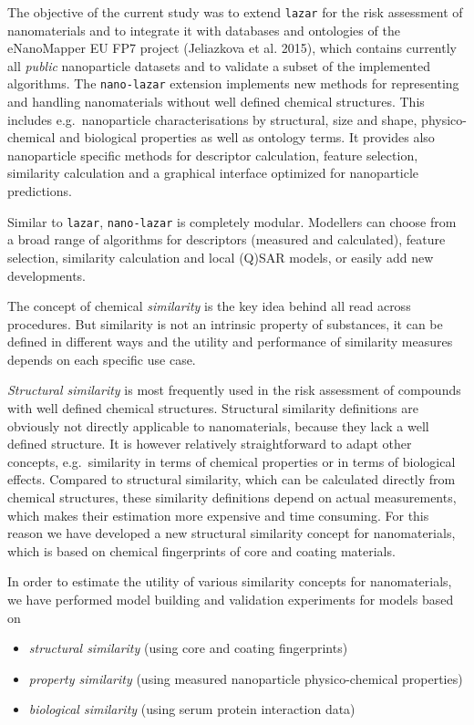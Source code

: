 \documentclass[utf8]{frontiersHLTH} %
\providecommand{\tightlist}{%
  \setlength{\itemsep}{0pt}\setlength{\parskip}{0pt}}
\begin{document}
The objective of the current study was to extend \texttt{lazar} for the
risk assessment of nanomaterials and to integrate it with databases and
ontologies of the eNanoMapper EU FP7 project (Jeliazkova et al. 2015),
which contains currently all \emph{public} nanoparticle datasets and to
validate a subset of the implemented algorithms. The \texttt{nano-lazar}
extension implements new methods for representing and handling
nanomaterials without well defined chemical structures. This includes
e.g.~nanoparticle characterisations by structural, size and shape,
physico-chemical and biological properties as well as ontology terms. It
provides also nanoparticle specific methods for descriptor calculation,
feature selection, similarity calculation and a graphical interface
optimized for nanoparticle predictions.

Similar to \texttt{lazar}, \texttt{nano-lazar} is completely modular.
Modellers can choose from a broad range of algorithms for descriptors
(measured and calculated), feature selection, similarity calculation and
local (Q)SAR models, or easily add new developments.

The concept of chemical \emph{similarity} is the key idea behind all
read across procedures. But similarity is not an intrinsic property of
substances, it can be defined in different ways and the utility and
performance of similarity measures depends on each specific use case.

\emph{Structural similarity} is most frequently used in the risk
assessment of compounds with well defined chemical structures.
Structural similarity definitions are obviously not directly applicable
to nanomaterials, because they lack a well defined structure. It is
however relatively straightforward to adapt other concepts,
e.g.~similarity in terms of chemical properties or in terms of
biological effects. Compared to structural similarity, which can be
calculated directly from chemical structures, these similarity
definitions depend on actual measurements, which makes their estimation
more expensive and time consuming. For this reason we have developed a
new structural similarity concept for nanomaterials, which is based on
chemical fingerprints of core and coating materials.

In order to estimate the utility of various similarity concepts for
nanomaterials, we have performed model building and validation
experiments for models based on

\begin{itemize}
\tightlist
\item
  \emph{structural similarity} (using core and coating fingerprints)
\item
  \emph{property similarity} (using measured nanoparticle
  physico-chemical properties)
\item
  \emph{biological similarity} (using serum protein interaction data)
\end{itemize}
\end{document}
